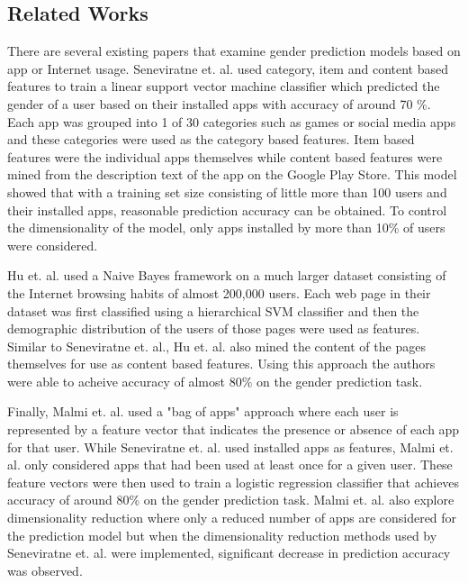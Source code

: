 \documentclass[10pt,twocolumn,letterpaper]{article}
\begin{document}
\subsection{Related Works}

There are several existing papers that examine gender prediction models based on app or Internet usage. Seneviratne et. al. \cite{Seneviratne:2014:YIA:2646584.2646587} used category, item and content based features to train a linear support vector machine classifier which predicted the gender of a user based on their installed apps with accuracy of around 70 \%.  Each app was grouped into 1 of 30 categories such as games or social media apps and these categories were used as the category based features.  Item based features were the individual apps themselves while content based features were mined from the description text of the app on the Google Play Store.  This model showed that with a training set size consisting of little more than 100 users and their installed apps, reasonable prediction accuracy can be obtained. To control the dimensionality of the model, only apps installed by more than 10\% of users were considered.  

Hu et. al. \cite{hu2007demographic} used a Naive Bayes framework on a much larger dataset consisting of the Internet browsing habits of almost 200,000 users.  Each web page in their dataset was first classified using a hierarchical SVM classifier and then the demographic distribution of the users of those pages were used as features.  Similar to Seneviratne et. al., Hu et. al. also mined the content of the pages themselves for use as content based features.  Using this approach the authors were able to acheive accuracy of almost 80\% on the gender prediction task. 

Finally, Malmi et. al. \cite{DBLP:journals/corr/MalmiW16} used a "bag of apps" approach where each user is represented by a feature vector that indicates the presence or absence of each app for that user.  While Seneviratne et. al. used installed apps as features, Malmi et. al. only considered apps that had been used at least once for a given user.  These feature vectors were then used to train a logistic regression classifier that achieves accuracy of around 80\% on the gender prediction task.  Malmi et. al. also explore dimensionality reduction where only a reduced number of apps are considered for the prediction model but when the dimensionality reduction methods used by Seneviratne et. al. were implemented, significant decrease in prediction accuracy was observed.
\end{document}
